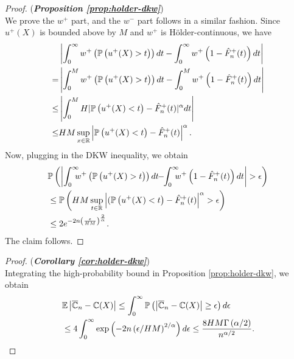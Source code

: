\begin{proof}(\textbf{\textit{Proposition \ref{prop:holder-dkw}}})\ \\
We prove the $w^+$ part, and the $w^-$ part follows in a similar fashion.
Since $u^+(X)$ is bounded above by $M$ and $w^+$ is H\"{o}lder-continuous, we have
\begin{align*}
&\left|\int_0^{\infty} w^+\left(\mathbb{P}\left( u^+(X)>t \right)\right) dt- \int_0^{\infty} w^+\left(1- {\hat F^+_n}(t)\right) dt\right| \\ = &
    \left|\int_0^M w^+\left(\mathbb{P}\left( u^+(X)>t \right)\right) dt- \int_0^M w^+\left(1- {\hat F^+_n}(t)\right) dt\right| \\
\leq& \left|\int_0^M H |\mathbb{P}\left( u^+(X)<t \right)-{\hat F^+_n}(t)|^\alpha dt\right|\\ \leq& HM\sup_{x\in
\mathbb{R}}\left|\mathbb{P}\left( u^+(X)<t \right)-{\hat F^+_n}(t)\right|^\alpha.
\end{align*}
Now, plugging in the DKW inequality, we obtain
\begin{align}
&\mathbb{P}\left(\left|\intinfinity\!\!\!\! w^+\left(\Prob{u^+(X)>t}\right) dt \!\!-\!\! \intinfinity\!\!\!\! w^+\left(1- {\hat F^+_n}(t)\right) dt\right|>\epsilon\right)
\nonumber\\
& \leq \Prob{HM\sup_{t\in \mathbb{R}} \left|(\Prob{u^+(X)<t}-{\hat F^+_n}(t)\right|^\alpha>\epsilon}\nonumber\\
&
\leq  2 e^{-2n \left(\frac{\epsilon}{HM} \right)^\frac{2}{\alpha}}.\label{eq:dkw3}
\end{align}
The claim follows.
\end{proof}

\begin{proof}(\textbf{\textit{Corollary \ref{cor:holder-dkw}}})\ \\
 Integrating the high-probability bound in Proposition \ref{prop:holder-dkw}, we obtain
 \begin{align*}
& \mathbb{E} \left|\overline {\mathbb{C}}_n- \mathbb{C}(X) \right|  
  \le \int_0^{\infty} \mathbb{P}\left( \left|\overline {\mathbb{C}}_n- \mathbb{C}(X) \right| \geq  \epsilon \right) d\epsilon\\
  &\le 4 \int_0^{\infty} \exp\left(-2n\left(\epsilon/HM\right)^{2/\alpha}\right) d\epsilon \le \frac{8HM \Gamma\left(\alpha/2\right)}{n^{\alpha/2}}.
 \end{align*}
\end{proof}


